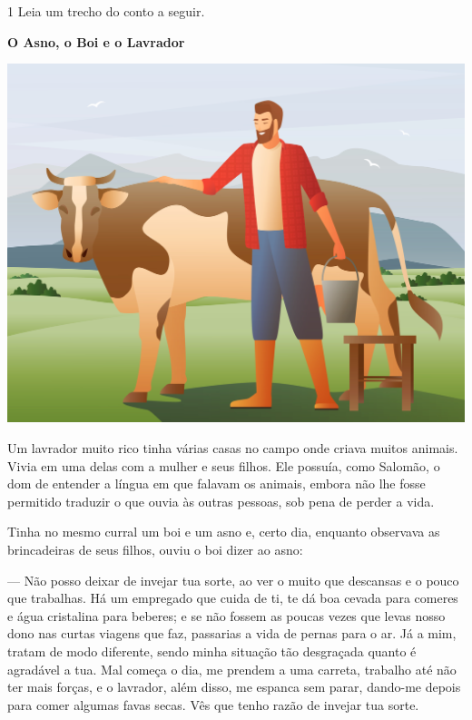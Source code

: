\vspace*{-1.5cm}
\enlargethispage{3\baselineskip}

\num{1} Leia um trecho do conto a seguir.

\begin{myquote}
\textbf{O Asno, o Boi e o Lavrador}

\begin{center}
\includegraphics[width=.8\textwidth]{media/image50.jpeg}
\end{center}

Um lavrador muito rico tinha várias casas no campo onde criava muitos
animais. Vivia em uma delas com a mulher e seus filhos. Ele possuía,
como Salomão, o dom de entender a língua em que falavam os animais,
embora não lhe fosse permitido traduzir o que ouvia às outras pessoas,
sob pena de perder a vida.

Tinha no mesmo curral um boi e um asno e, certo dia, enquanto observava
as brincadeiras de seus filhos, ouviu o boi dizer ao asno:

--- Não posso deixar de invejar tua sorte, ao ver o muito que descansas e
o pouco que trabalhas. Há um empregado que cuida de ti, te dá boa cevada
para comeres e água cristalina para beberes; e se não fossem as poucas
vezes que levas nosso dono nas curtas viagens que faz, passarias a vida
de pernas para o ar. Já a mim, tratam de modo diferente, sendo minha
situação tão desgraçada quanto é agradável a tua. Mal começa o dia, me
prendem a uma carreta, trabalho até não ter mais forças, e o lavrador,
além disso, me espanca sem parar, dando-me depois para comer algumas
favas secas. Vês que tenho razão de invejar tua sorte.

\end{myquote}

